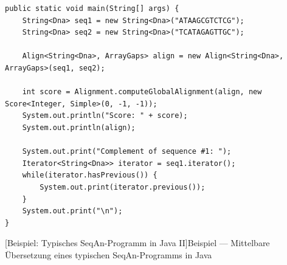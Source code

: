 \documentclass[11pt,a4paper]{book}
\begin{document}
\begin{center}
\begin{verbatim}
public static void main(String[] args) {
    String<Dna> seq1 = new String<Dna>("ATAAGCGTCTCG");
    String<Dna> seq2 = new String<Dna>("TCATAGAGTTGC");

    Align<String<Dna>, ArrayGaps> align = new Align<String<Dna>, ArrayGaps>(seq1, seq2);

    int score = Alignment.computeGlobalAlignment(align, new Score<Integer, Simple>(0, -1, -1));
    System.out.println("Score: " + score);
    System.out.println(align);

    System.out.print("Complement of sequence #1: ");
    Iterator<String<Dna>> iterator = seq1.iterator();
    while(iterator.hasPrevious()) {
        System.out.print(iterator.previous());
    }
    System.out.print("\n");
}
\end{verbatim}
[Beispiel: Typisches SeqAn-Programm in Java II]{Beispiel --- Mittelbare Übersetzung eines typischen SeqAn-Programms in Java}
\label{lst:seqan-typical-java2}
\end{center}





\tableofcontents

\listoffigures

%





%

%

%

%

%
%
%


\listoflistings

\listoffigures

\clearpage

\printglossary[title=Glossar, toctitle=Glossar]

\label{Bibliography}
\end{document}
